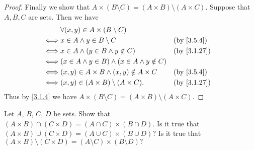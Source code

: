 \begin{proof}
  Finally we show that \(A \times (B \setminus C) = (A \times B) \setminus (A \times C)\).
  Suppose that \(A, B, C\) are sets.
  Then we have
  \begin{align*}
         & \forall (x, y) \in A \times (B \setminus C)                                             \\
    \iff & x \in A \land y \in B \setminus C                        &  & \by{3.5.4}                \\
    \iff & x \in A \land (y \in B \land y \notin C)                 &  & \text{(by \cref{3.1.27})} \\
    \iff & (x \in A \land y \in B) \land (x \in A \land y \notin C)                                \\
    \iff & (x, y) \in A \times B \land (x, y) \notin A \times C     &  & \by{3.5.4}                \\
    \iff & (x, y) \in (A \times B) \setminus (A \times C).          &  & \text{(by \cref{3.1.27})}
  \end{align*}
  Thus by \cref{3.1.4} we have \(A \times (B \setminus C) = (A \times B) \setminus (A \times C)\).
\end{proof}

\begin{ex}\label{ex:3.5.5}
  Let \(A\), \(B\), \(C\), \(D\) be sets.
  Show that \((A \times B) \cap (C \times D) = (A \cap C) \times (B \cap D)\).
  Is it true that \((A \times B) \cup (C \times D) = (A \cup C) \times (B \cup D)?\)
  Is it true that \((A \times B) \setminus (C \times D) = (A \setminus C) \times (B \setminus D)?\)
\end{ex}

